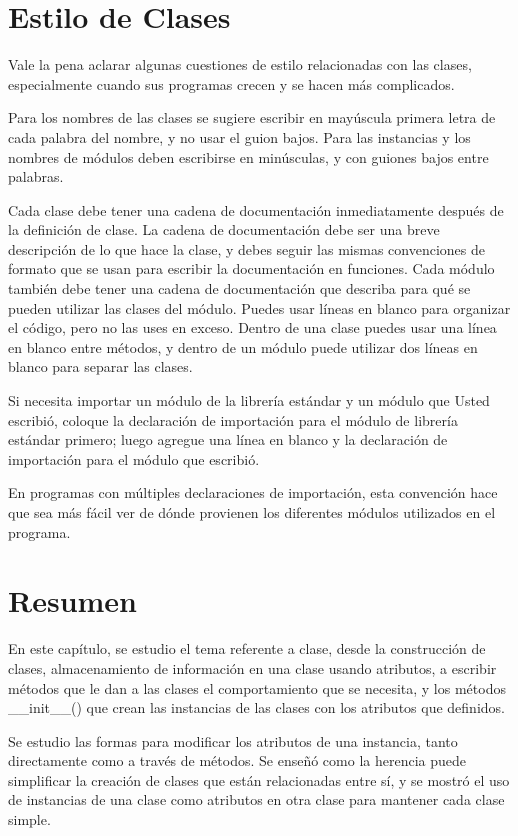 {\section{Estilo de Clases}

Vale la pena aclarar algunas cuestiones de estilo relacionadas con las clases, especialmente cuando sus programas crecen y se hacen más complicados.

Para los nombres de las clases se sugiere escribir en mayúscula primera letra de cada palabra del nombre, y no usar el guion bajos. Para las instancias y los nombres de módulos deben escribirse en minúsculas, y con guiones bajos entre palabras.

Cada clase debe tener una cadena de documentación inmediatamente después de la definición de clase. La cadena de documentación debe ser una breve descripción de lo que hace la clase, y debes seguir las mismas convenciones de formato que se usan para escribir la documentación en funciones.
Cada módulo también debe tener una cadena de documentación que describa para qué se pueden utilizar las clases del módulo. Puedes usar líneas en blanco para organizar el código, pero no las uses en exceso. Dentro de una clase puedes
usar una línea en blanco entre métodos, y dentro de un módulo puede utilizar dos líneas en blanco para separar las clases.

Si necesita importar un módulo de la librería estándar y un módulo que Usted escribió, coloque la declaración de importación para el módulo de librería estándar primero; luego agregue una línea en blanco y la declaración de importación para el módulo que escribió. 

En programas con múltiples declaraciones de importación, esta convención hace que sea más fácil ver 
de dónde provienen los diferentes módulos utilizados en el programa.

\section{Resumen}


En este capítulo, se estudio el tema referente a clase, desde la construcción de clases,  almacenamiento de  información en una clase usando atributos, a escribir métodos que le dan a las clases el comportamiento que se necesita, y los métodos {\ttfamily \_\!\_init\_\!\_()} que crean las instancias de las clases con los atributos que definidos.

Se estudio las formas para modificar los atributos de una instancia, tanto directamente como a través de métodos.
Se enseñó como la herencia puede simplificar la creación de clases que están relacionadas entre sí, 
y se mostró el uso de instancias de una clase como atributos en otra clase para mantener cada clase simple.

}
